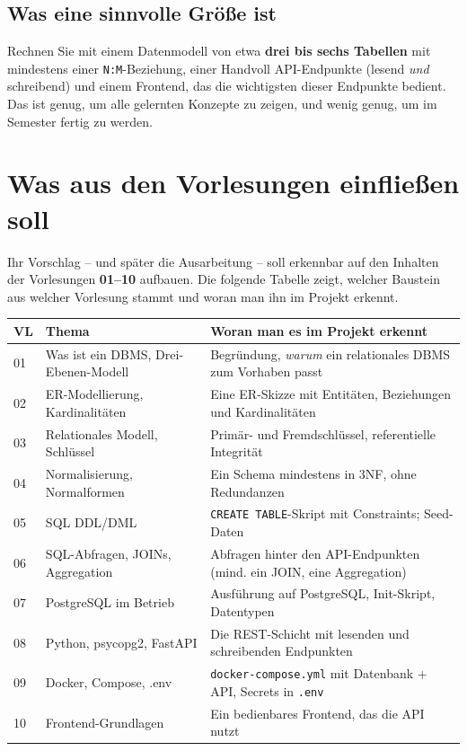 \documentclass[11pt,a4paper]{article}
\begin{document}
\subsection{Was eine sinnvolle Größe ist}

Rechnen Sie mit einem Datenmodell von etwa \textbf{drei bis sechs Tabellen} mit
mindestens einer \texttt{N:M}-Beziehung, einer Handvoll API-Endpunkte (lesend
\emph{und} schreibend) und einem Frontend, das die wichtigsten dieser Endpunkte
bedient. Das ist genug, um alle gelernten Konzepte zu zeigen, und wenig genug,
um im Semester fertig zu werden.

\section{Was aus den Vorlesungen einfließen soll}

Ihr Vorschlag -- und später die Ausarbeitung -- soll erkennbar auf den Inhalten
der Vorlesungen \textbf{01--10} aufbauen. Die folgende Tabelle zeigt, welcher
Baustein aus welcher Vorlesung stammt und woran man ihn im Projekt erkennt.

\renewcommand{\arraystretch}{1.3}
\begin{tabularx}{\linewidth}{@{}p{1.5cm}p{4.6cm}X@{}}
\toprule
\textbf{VL} & \textbf{Thema} & \textbf{Woran man es im Projekt erkennt} \\
\midrule
01 & Was ist ein DBMS, Drei-Ebenen-Modell & Begründung, \emph{warum} ein
     relationales DBMS zum Vorhaben passt \\
02 & ER-Modellierung, Kardinalitäten & Eine ER-Skizze mit Entitäten,
     Beziehungen und Kardinalitäten \\
03 & Relationales Modell, Schlüssel & Primär- und Fremdschlüssel, referentielle
     Integrität \\
04 & Normalisierung, Normalformen & Ein Schema mindestens in 3NF, ohne
     Redundanzen \\
05 & SQL DDL/DML & \texttt{CREATE TABLE}-Skript mit Constraints; Seed-Daten \\
06 & SQL-Abfragen, JOINs, Aggregation & Abfragen hinter den API-Endpunkten
     (mind. ein JOIN, eine Aggregation) \\
07 & PostgreSQL im Betrieb & Ausführung auf PostgreSQL, Init-Skript, Datentypen \\
08 & Python, psycopg2, FastAPI & Die REST-Schicht mit lesenden und schreibenden
     Endpunkten \\
09 & Docker, Compose, .env & \texttt{docker-compose.yml} mit Datenbank + API,
     Secrets in \texttt{.env} \\
10 & Frontend-Grundlagen & Ein bedienbares Frontend, das die API nutzt \\
\bottomrule
\end{tabularx}
\end{document}
